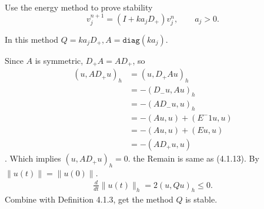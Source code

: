 \exc Use the energy method to prove stability
\[v_j^{n + 1} = (I + ka_j D_+) v_j^n, \qquad a_j > 0.\]


\begin{solution}
  In this method $Q = ka_jD_+, A = \texttt{diag}(ka_j)$. 
  
  Since $A$ is symmetric, $D_+A = A D_+$, so
    \begin{align*}
      (u, AD_+ u)_h &= (u, D_+A u)_h \\
      &=-(D_- u, Au)_h  \\
      &=-(AD_- u, u)_h \\ 
      &=-(Au, u) + (E^-1 u, u) \\
      &=-(Au, u) + (E u, u) \\
      &= -(AD_+ u, u)
    \end{align*}.
    Which implies $(u, AD_+ u)_h = 0$. the Remain is 
    same as (4.1.13). By $\|u(t)\| = \|u(0)\|$.
    \begin{align*}
      \frac{d}{dt} \|u(t)\|_h = 2(u, Q u)_h \leq 0.
    \end{align*}
    Combine with Definition 4.1.3, get the method $Q$
    is stable.

\end{solution}